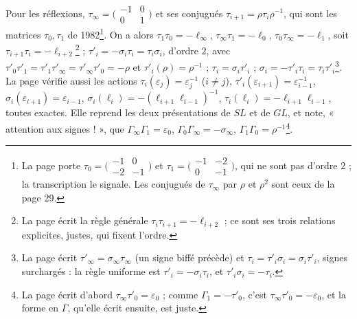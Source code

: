 \documentclass[11pt,a4paper]{article}
\begin{document}
Pour les réflexions, $\tau_\infty = \bigl(\begin{smallmatrix} -1 & 0 \\ 0 & 1 \end{smallmatrix}\bigr)$
et ses conjugués $\tau_{i+1} = \rho\tau_i\rho^{-1}$, qui sont les matrices
$\tau_0, \tau_1$ de 1982\footnote{La page porte
$\tau_0 = \bigl(\begin{smallmatrix} -1 & 0 \\ -2 & -1 \end{smallmatrix}\bigr)$ et
$\tau_1 = \bigl(\begin{smallmatrix} -1 & -2 \\ 0 & -1 \end{smallmatrix}\bigr)$,
qui ne sont pas d'ordre $2$ ; la transcription le signale. Les conjugués de
$\tau_\infty$ par $\rho$ et $\rho^2$ sont ceux de la page 29.}. On a alors
$\tau_1\tau_0 = -\ell_\infty$, $\tau_\infty\tau_1 = -\ell_0$, $\tau_0\tau_\infty = -\ell_1$,
soit $\tau_{i+1}\tau_i = -\ell_{i+2}$\footnote{La page écrit la règle générale
$\tau_i\tau_{i+1} = -\ell_{i+2}$ ; ce sont ses trois relations explicites, justes,
qui fixent l'ordre.} ;
$\tau'_i = -\sigma_i\tau_i = \tau_i\sigma_i$, d'ordre $2$, avec
$\tau'_0\tau'_1 = \tau'_1\tau'_\infty = \tau'_\infty\tau'_0 = -\rho$ et
$\tau'_i(\rho) = \rho^{-1}$ ; $\tau_i = \sigma_i\tau'_i$ ;
$\sigma_i = -\tau'_i\tau_i = \tau_i\tau'_i$\footnote{La page écrit
$\tau'_\infty = \sigma_\infty\tau_\infty$ (un signe biffé précède) et
$\tau_i = \tau'_i\sigma_i = \sigma_i\tau'_i$, signes surchargés : la règle
uniforme est $\tau'_i = -\sigma_i\tau_i$, et $\tau'_i\sigma_i = -\tau_i$.}.
La page vérifie aussi les actions $\tau_i(\varepsilon_j) = \varepsilon_j^{-1}$
($i \neq j$), $\tau'_i(\varepsilon_{i+1}) = \varepsilon_{i-1}^{-1}$,
$\sigma_i(\varepsilon_{i+1}) = \varepsilon_{i-1}$,
$\sigma_i(\ell_i) = -(\ell_{i+1}\ell_{i-1})^{-1}$,
$\tau_i(\ell_i) = -\ell_{i+1}\ell_{i-1}$, toutes exactes. Elle reprend les deux
présentations de $SL$ et de $GL$, et note, « attention aux signes ! », que
$\Gamma_\infty\Gamma_1 = \varepsilon_0$, $\Gamma_0\Gamma_\infty = -\sigma_\infty$,
$\Gamma_1\Gamma_0 = \rho^{-1}$\footnote{La page écrit d'abord
$\tau_\infty\tau'_0 = \varepsilon_0$ ; comme $\Gamma_1 = -\tau'_0$, c'est
$\tau_\infty\tau'_0 = -\varepsilon_0$, et la forme en $\Gamma$, qu'elle écrit
ensuite, est juste.}.
\end{document}
